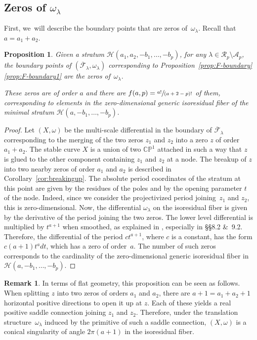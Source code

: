 \documentclass[JEP,XML,SOM,Unicode,NoFloatCountersInSection,published]{cedram}
\newtheorem{prop}[thm]{Proposition}
\theoremstyle{definition}
\newtheorem{rmk}[thm]{Remark}
\begin{document}
\subsection{Zeros of $\omega_{\lambda}$}\label{subsub:zeros}

First, we~will describe the boundary points that are zeros of~$\omega_{\lambda}$. Recall that $a=a_{1}+a_{2}$.
\begin{prop}\label{prop:zeros}
Given a stratum $\mathcal{H}(a_{1},a_{2},-b_{1},\dots,-b_{p})$, for any $\lambda \in \mathcal{R}_{p} \setminus \mathcal{A}_{p}$, the boundary points of $(\overline{\mathcal{F}}_{\lambda}, \omega_\lambda)$ corresponding to Proposition~\ref{prop:F-boundary}\eqref{prop:F-boundary1} are the zeros of~$\omega_{\lambda}$.

These zeros are of order $a$ and there are $f(a,p)=\sfrac{a!}{(a+2-p)!}$ of them, corresponding to elements in the zero-dimensional generic isoresidual fiber of the minimal stratum $\mathcal{H}(a,-b_{1},\dots,-b_{p})$.
\end{prop}

\begin{proof}
Let $(X,\omega)$ be the multi-scale differential in the boundary of $\overline{\mathcal F}_\lambda$ corresponding to the merging of the two zeros $z_1$ and $z_2$ into a zero $z$ of order $a_1 + a_2$. The stable curve $X$ is a union of two $\mathbb{CP}^1$ attached in such a way that $z$ is glued to the other component containing $z_1$ and $z_2$ at a node. The breakup of $z$ into two nearby zeros of order $a_1$ and $a_2$ is described in Corollary~\ref{cor:breakingup}. The absolute period coordinates of the stratum at this point are given by the residues of the poles and by the opening parameter $t$ of the node. Indeed, since we consider the projectivized period joining~$z_{1}$ and $z_{2}$, this is zero-dimensional. Now, the differential $\omega_{\lambda}$ on the isoresidual fiber is given by the derivative of the period joining the two zeros. The lower level differential is multiplied by $t^{a+1}$ when smoothed, as explained in \cite{BCGGM2}, especially in \S\S 8.2 \&~9.2. Therefore, the differential of the period $ct^{a+1}$, where $c$ is a constant, has the form $c(a+1)t^{a}dt$, which has a zero of order~$a$. The number of such zeros corresponds to the cardinality of the zero-dimensional generic isoresidual fiber in $\mathcal{H}(a,-b_{1},\dots,-b_{p})$.
\end{proof}

\begin{rmk}
In terms of flat geometry, this proposition can be seen as follows. When splitting $z$ into two zeros of orders $a_{1}$ and $a_{2}$, there are $a +1 = a_1 + a_2 + 1$ horizontal positive directions to open it up at $z$. Each of these yields a real positive saddle connection joining $z_1$ and $z_2$. Therefore, under the translation structure~$\omega_\lambda$ induced by the primitive of such a saddle connection, $(X,\omega)$ is a conical singularity of angle $2\pi (a+1)$ in the isoresidual fiber.
\end{rmk}
\end{document}
